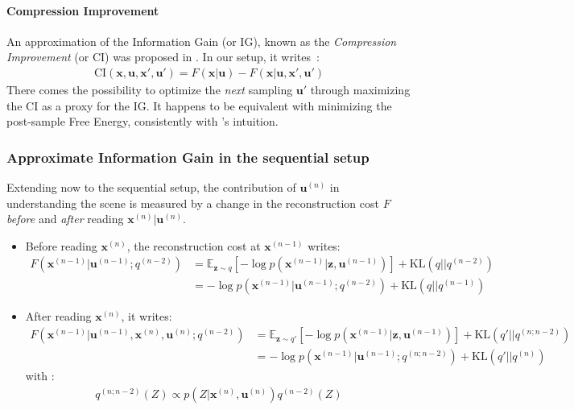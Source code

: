 \documentclass[12pt,twoside,openright]{article}
\begin{document}
\paragraph{Compression Improvement}
An approximation of the Information Gain (or IG), known as the \emph{Compression Improvement} (or CI) was proposed in \citet{schmidhuber2007simple,houthooft2016vime}. In our setup, it
writes~:
\begin{align}
\text{CI}(\boldsymbol{x},\boldsymbol{u}, \boldsymbol{x}', \boldsymbol{u}') = F(\boldsymbol{x}|\boldsymbol{u}) - F(\boldsymbol{x}|\boldsymbol{u}, \boldsymbol{x}', \boldsymbol{u}') \label{eq:CI-base}
\end{align}	
There comes the possibility to  {\color{Purple}optimize the \emph{next} sampling $\boldsymbol{u}'$ through maximizing the CI as a proxy for the IG. It happens 
to be equivalent with minimizing the post-sample Free Energy, consistently with \citet{friston2012perceptions}'s intuition.}

\subsubsection{Approximate Information Gain in the sequential setup}

{\color{Purple} Extending now to the sequential setup}, the contribution of $\boldsymbol{u}^{(n)}$ in understanding the scene is measured by a change in the reconstruction cost $F$ \emph{before} and \emph{after} reading $\boldsymbol{x}^{(n)}|\boldsymbol{u}^{(n)}$.
\begin{itemize}
	\item Before {\color{Purple} reading $\boldsymbol{x}^{(n)}$}, the reconstruction cost at $\boldsymbol{x}^{(n-1)}$ writes:
	\begin{align}
	F(\boldsymbol{x}^{(n-1)}|\boldsymbol{u}^{(n-1)}; q^{(n-2)}) 
	&= \mathbb{E}_{\boldsymbol{z} \sim q} \left[-\log p(\boldsymbol{x}^{(n-1)}| \boldsymbol{z}, \boldsymbol{u}^{(n-1)} )
	\right] + \text{KL}(q||q^{(n-2)}) \label{eq:F_pre_var}\\
	&= -\log p(\boldsymbol{x}^{(n-1)}|\boldsymbol{u}^{(n-1)}; q^{(n-2)}) + \text{KL} (q||q^{(n-1)})\label{eq:F_pre_KL}
	\end{align}
	\item After {\color{Purple} reading $\boldsymbol{x}^{(n)}$}, it writes:
	\begin{align}
	F(\boldsymbol{x}^{(n-1)}|\boldsymbol{u}^{(n-1)},\boldsymbol{x}^{(n)},\boldsymbol{u}^{(n)}; q^{(n-2)}) 
	&= \mathbb{E}_{\boldsymbol{z} \sim q'} \left[-\log p(\boldsymbol{x}^{(n-1)}| \boldsymbol{z}, \boldsymbol{u}^{(n-1)} )
	\right] + \text{KL}(q'||q^{(n;n-2)}) \label{eq:F_post_var}\\
	&= -\log p(\boldsymbol{x}^{(n-1)}|\boldsymbol{u}^{(n-1)}; q^{(n;n-2)}) + \text{KL} (q'||q^{(n)})\label{eq:F_post_KL}
	\end{align}
	with :
	\begin{align}
	q^{(n; n-2)}(Z) \propto p(Z|\boldsymbol{x}^{(n)}, \boldsymbol{u}^{(n)})q^{(n-2)}(Z)\label{eq:n-n-2}
	\end{align}
\end{itemize}
\end{document}
